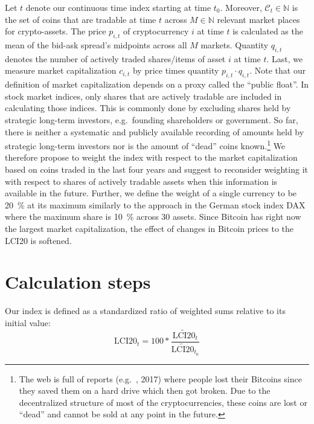 \documentclass[11pt]{article}
\begin{document}
Let $t$ denote our continuous time index starting at time $t_0$.
Moreover, $\mathcal{C}_t \in \mathbb{N}$ is the set of coins that are tradable at time $t$ across $M \in \mathbb{N}$ relevant market places for crypto-assets.
The price $p_{i,t}$ of cryptocurrency $i$ at time $t$ is calculated as the mean of the bid-ask spread's midpoints across all $M$ markets.
Quantity $q_{i,t}$ denotes the number of actively traded shares/items of asset $i$ at time $t$.
Last, we measure market capitalization $c_{i,t}$ by price times quantity $p_{i,t} \cdot q_{i,t}$.
Note that our definition of market capitalization depends on a proxy  called the ``public float''.
In stock market indices, only shares that are actively tradable are included in calculating those indices.
This is commonly done by excluding shares held by strategic long-term investors, e.g.\ founding shareholders or government.
So far, there is neither a systematic and publicly available recording of amounts held by strategic long-term investors nor is the amount of ``dead'' coins known.\footnote{The web is full of reports (e.g.\ \citeauthor{LetsTalkBitcoin}, 2017) where people lost their Bitcoins since they saved them on a hard drive which then got broken.
Due to the decentralized structure of most of the cryptocurrencies, these coins are lost or ``dead'' and cannot be sold at any point in the future.}
We therefore propose to weight the index with respect to the market capitalization based on coins traded in the last four years and suggest to reconsider weighting it with respect to shares of actively tradable assets when this information is available in the future.
Further, we define the weight of a single currency to be 20~\% at its maximum similarly to the approach in the German stock index DAX where the maximum share is 10~\% across 30 assets.
Since Bitcoin has right now the largest market capitalization, the effect of changes in Bitcoin prices to the LCI20 is softened.


\section{Calculation steps}

Our index is defined as a standardized ratio of weighted sums relative to its initial value:
\begin{equation}
  \text{LCI20}_t = 100 * \frac{\widetilde{\text{LCI20}}_t}{\widetilde{\text{LCI20}}_{t_0}}
\end{equation}
\end{document}
